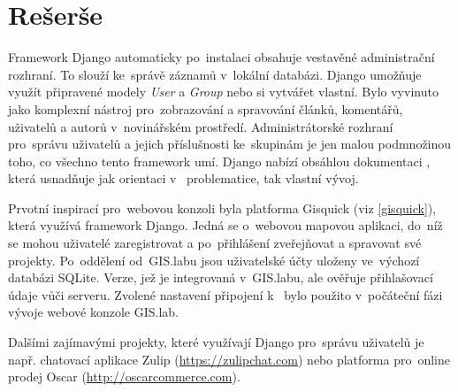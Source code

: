 \chapter{Rešerše}
\label{0-reserse}

Framework Django automaticky po~instalaci obsahuje vestavěné
administrační roz\-hraní. To slouží ke~správě záznamů v~lokální
databázi. Django umožňuje využít připravené modely \textit{User} a
\textit{Group} nebo si vytvářet vlastní. Bylo vyvinuto jako komplexní
nástroj pro~zobrazování a spravování článků, komentářů, uživatelů a
autorů v~novinářském prostředí. Administrátorské rozhraní pro~správu
uživatelů a jejich příslušnosti ke~skupinám je jen malou podmnožinou
toho, co všechno tento framework umí. Django nabízí obsáhlou
dokumentaci \cite{django-doc}, která usnadňuje jak orientaci v~
problematice, tak vlastní vývoj.

Prvotní inspirací pro~webovou konzoli byla platforma Gisquick (viz
\ref{gisquick}), která využívá framework Django. Jedná se o~webovou
mapovou aplikaci, do~níž se mohou uživatelé zaregistrovat a po~přihlášení 
zveřejňovat a spravovat své projekty. Po~od\-dělení od~GIS.labu 
jsou uživatelské účty uloženy ve~výchozí databázi
SQLite. Verze, jež je integrovaná v~GIS.labu, ale ověřuje přihlašovací
údaje vůči  serveru. Zvolené nastavení připojení k~
bylo použito v~počáteční fázi vývoje webové konzole GIS.lab.

Dalšími zajímavými projekty, které využívají Django pro~správu
uživatelů je např. chatovací aplikace Zulip
(\href{https://zulipchat.com}{https://zulipchat.com}) nebo platforma
pro~online prodej Oscar
(\href{http://oscarcommerce.com}{http://oscarcommerce.com}).